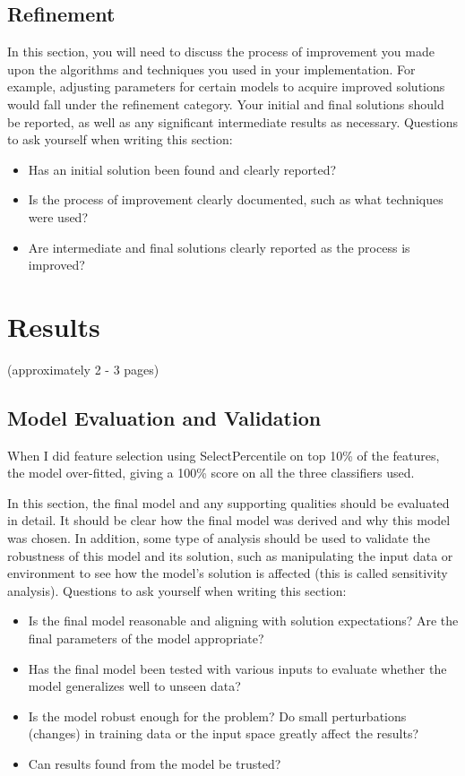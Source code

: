 \documentclass[twoside,openright,titlepage,numbers=noenddot,headinclude,%
               footinclude=true,cleardoublepage=empty,abstractoff,BCOR=5mm,%
               paper=a4,fontsize=11pt,ngerman,american]{scrreprt}
\numberwithin{theorem}{chapter}
\numberwithin{definition}{chapter}
\numberwithin{algorithm}{chapter}
\numberwithin{figure}{chapter}
\numberwithin{table}{chapter}
\numberwithin{equation}{chapter}
\begin{document}
\section*{Refinement}
In this section, you will need to discuss the process of improvement you made upon the algorithms and techniques you used in your implementation. For example, adjusting parameters for certain models to acquire improved solutions would fall under the refinement category. Your initial and final solutions should be reported, as well as any significant intermediate results as necessary. Questions to ask yourself when writing this section:
\begin{itemize}%
\item Has an initial solution been found and clearly reported?
\item Is the process of improvement clearly documented, such as what techniques were used?
\item Are intermediate and final solutions clearly reported as the process is improved?
\end{itemize}

\chapter*{Results}
(approximately 2 - 3 pages)


\section*{Model Evaluation and Validation}

When I did feature selection using SelectPercentile on top 10\% of the features, the model over-fitted, giving a 100\% score on all the three classifiers used.


In this section, the final model and any supporting qualities should be evaluated in detail. It should be clear how the final model was derived and why this model was chosen. In addition, some type of analysis should be used to validate the robustness of this model and its solution, such as manipulating the input data or environment to see how the model’s solution is affected (this is called sensitivity analysis). Questions to ask yourself when writing this section:
\begin{itemize}%
\item Is the final model reasonable and aligning with solution expectations? Are the final parameters of the model appropriate?
\item Has the final model been tested with various inputs to evaluate whether the model generalizes well to unseen data?
\item Is the model robust enough for the problem? Do small perturbations (changes) in training data or the input space greatly affect the results?
\item Can results found from the model be trusted?
\end{itemize}
\end{document}
